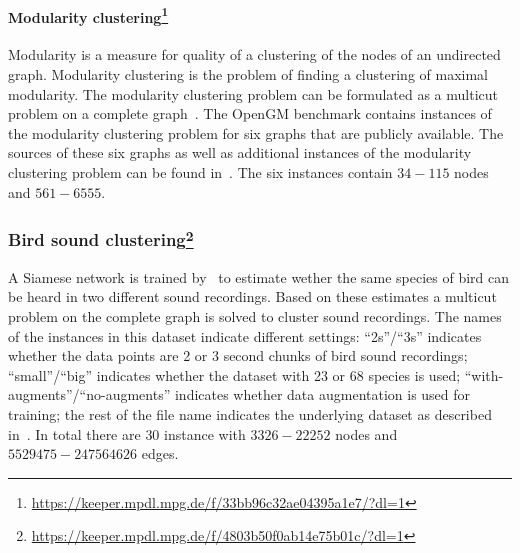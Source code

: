 \paragraph*{Modularity clustering\footnote{\url{https://keeper.mpdl.mpg.de/f/33bb96c32ae04395a1e7/?dl=1}}}
Modularity is a measure for quality of a clustering of the nodes of an undirected graph.
Modularity clustering is the problem of finding a clustering of maximal modularity.
The modularity clustering problem can be formulated as a multicut problem on a complete graph~\cite{brandes2008modularity}.
The OpenGM benchmark contains instances of the modularity clustering problem for six graphs that are publicly available.
The sources of these six graphs as well as additional instances of the modularity clustering problem can be found in~\cite{cafieri2011locally}.
The six instances contain $34-115$ nodes and $561-6555$.

\subsubsection[Bird sound clustering]{Bird sound clustering\footnote{\url{https://keeper.mpdl.mpg.de/f/4803b50f0ab14e75b01c/?dl=1}}}
A Siamese network is trained by~\cite{stein2023correlation} to estimate wether the same species of bird can be heard in two different sound recordings.
Based on these estimates a multicut problem on the complete graph is solved to cluster sound recordings.
The names of the instances in this dataset indicate different settings: ``2s''/``3s'' indicates whether the data points are 2 or 3 second chunks of bird sound recordings; ``small''/``big'' indicates whether the dataset with 23 or 68 species is used; ``with-augments''/``no-augments'' indicates whether data augmentation is used for training; the rest of the file name indicates the underlying dataset as described in~\cite{stein2023correlation}.
In total there are $30$ instance with $3326-22252$ nodes and $5529475-247564626$ edges.


